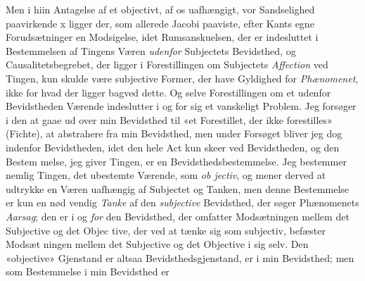 \documentclass[12pt,a4paper]{book}
\begin{document}
Men i hiin Antagelse af et objectivt, af os uafhængigt,
vor Sandselighed paavirkende x ligger der, som allerede Jacobi
paaviste, efter Kants egne Forudsætninger en Modsigelse, idet
Rumsanskuelsen, der er indesluttet i Bestemmelsen af Tingens
Væren \emph{udenfor} Subjectets Bevidsthed, og Causalitetsbegrebet,
der ligger i Forestillingen om Subjectets \emph{Affection} ved
Tingen, kun skulde være subjective Former, der have Gyldighed
for \emph{Phænomenet}, ikke for hvad der ligger bagved dette.
Og selve Forestillingen om et udenfor Bevidstheden Værende
indeslutter i og for sig et vanskeligt Problem. Jeg forsøger
i den at gaae ud over min Bevidsthed til «et Forestillet, der
ikke forestilles» (Fichte), at abstrahere fra min Bevidsthed,
men under Forsøget bliver jeg dog indenfor Bevidstheden, idet
den hele Act kun skeer ved Bevidstheden, og den Bestem\-%
melse, jeg giver Tingen, er en Bevidsthedsbestemmelse. Jeg
bestemmer nemlig Tingen, det ubestemte Værende, som \emph{ob\-%
jectiv}, og mener derved at udtrykke en Væren uafhængig af
Subjectet og Tanken, men denne Bestemmelse er kun en nød\-%
vendig \emph{Tanke} af den \emph{subjective} Bevidsthed, der søger
Phænomenets \emph{Aarsag}; den er i og \emph{for} den Bevidsthed, der
omfatter Modsætningen mellem det Subjective og det Objec\-%
tive, der ved at tænke sig som subjectiv, befæster Modsæt\-%
ningen mellem det Subjective og det Objective i sig selv.
Den «objective» Gjenstand er altsaa Bevidsthedsgjenstand, er
i min Bevidsthed; men som Bestemmelse i min Bevidsthed er
\end{document}
